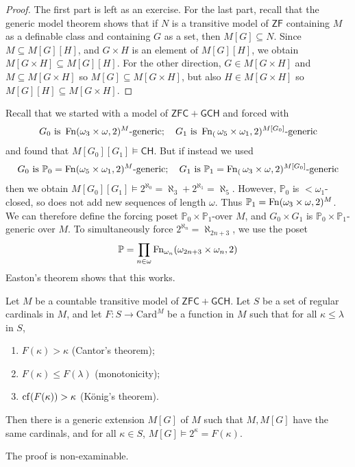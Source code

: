 \begin{proof}
    The first part is left as an exercise.
    For the last part, recall that the generic model theorem shows that if \( N \) is a transitive model of \( \mathsf{ZF} \) containing \( M \) as a definable class and containing \( G \) as a set, then \( M[G] \subseteq N \).
    Since \( M \subseteq M[G][H] \), and \( G \times H \) is an element of \( M[G][H] \), we obtain \( M[G \times H] \subseteq M[G][H] \).
    For the other direction, \( G \in M[G \times H] \) and \( M \subseteq M[G \times H] \) so \( M[G] \subseteq M[G \times H] \), but also \( H \in M[G \times H] \) so \( M[G][H] \subseteq M[G \times H] \).
\end{proof}
Recall that we started with a model of \( \mathsf{ZFC} + \mathsf{GCH} \) and forced with
\[ G_0 \text{ is } \operatorname{Fn}(\omega_3 \times \omega, 2)^M \text{-generic};\quad G_1 \text{ is } \operatorname{Fn}_(\omega_5 \times \omega_1, 2)^{M[G_0]} \text{-generic} \]
and found that \( M[G_0][G_1] \vDash \mathsf{CH} \).
But if instead we used
\[ G_0 \text{ is } \mathbb P_0 = \operatorname{Fn}(\omega_5 \times \omega_1, 2)^M \text{-generic};\quad G_1 \text{ is } \mathbb P_1 = \operatorname{Fn}_(\omega_3 \times \omega, 2)^{M[G_0]} \text{-generic} \]
then we obtain \( M[G_0][G_1] \vDash 2^{\aleph_0} = \aleph_3 + 2^{\aleph_1} = \aleph_5 \).
However, \( \mathbb P_0 \) is \( <\omega_1 \)-closed, so does not add new sequences of length \( \omega \).
Thus \( \mathbb P_1 = \operatorname{Fn}(\omega_3 \times \omega, 2)^M \).
We can therefore define the forcing poset \( \mathbb P_0 \times \mathbb P_1 \)-over \( M \), and \( G_0 \times G_1 \) is \( \mathbb P_0 \times \mathbb P_1 \)-generic over \( M \).
To simultaneously force \( 2^{\aleph_n} = \aleph_{2n + 3} \), we use the poset
\[ \mathbb P = \prod_{n \in \omega} \operatorname{Fn}_{\omega_n}(\omega_{2n + 3} \times \omega_n, 2) \]
Easton's theorem shows that this works.
\begin{theorem}
    Let \( M \) be a countable transitive model of \( \mathsf{ZFC} + \mathsf{GCH} \).
    Let \( S \) be a set of regular cardinals in \( M \), and let \( F : S \to \mathrm{Card}^M \) be a function in \( M \) such that for all \( \kappa \leq \lambda \) in \( S \),
    \begin{enumerate}
        \item \( F(\kappa) > \kappa \) (Cantor's theorem);
        \item \( F(\kappa) \leq F(\lambda) \) (monotonicity);
        \item \( \operatorname{cf}(F(\kappa)) > \kappa \) (K\"onig's theorem).
    \end{enumerate}
    Then there is a generic extension \( M[G] \) of \( M \) such that \( M, M[G] \) have the same cardinals, and for all \( \kappa \in S \), \( M[G] \vDash 2^\kappa = F(\kappa) \).
\end{theorem}
The proof is non-examinable.

